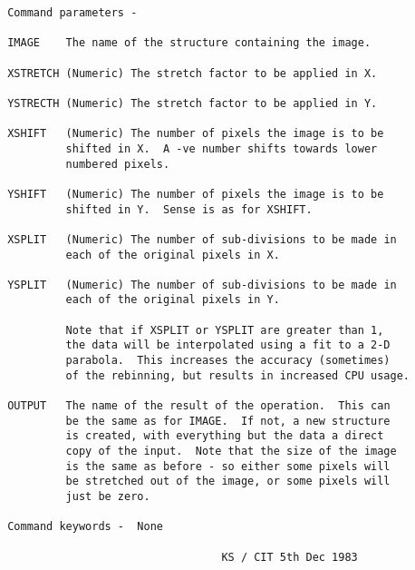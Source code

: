 \begin{description}
\begin{verbatim}
 Command parameters -

 IMAGE    The name of the structure containing the image.

 XSTRETCH (Numeric) The stretch factor to be applied in X.

 YSTRECTH (Numeric) The stretch factor to be applied in Y.

 XSHIFT   (Numeric) The number of pixels the image is to be
          shifted in X.  A -ve number shifts towards lower
          numbered pixels.

 YSHIFT   (Numeric) The number of pixels the image is to be
          shifted in Y.  Sense is as for XSHIFT.

 XSPLIT   (Numeric) The number of sub-divisions to be made in
          each of the original pixels in X.

 YSPLIT   (Numeric) The number of sub-divisions to be made in
          each of the original pixels in Y.

          Note that if XSPLIT or YSPLIT are greater than 1,
          the data will be interpolated using a fit to a 2-D
          parabola.  This increases the accuracy (sometimes)
          of the rebinning, but results in increased CPU usage.

 OUTPUT   The name of the result of the operation.  This can
          be the same as for IMAGE.  If not, a new structure
          is created, with everything but the data a direct
          copy of the input.  Note that the size of the image
          is the same as before - so either some pixels will
          be stretched out of the image, or some pixels will
          just be zero.

 Command keywords -  None

                                  KS / CIT 5th Dec 1983
\end{verbatim}
\end{description}

